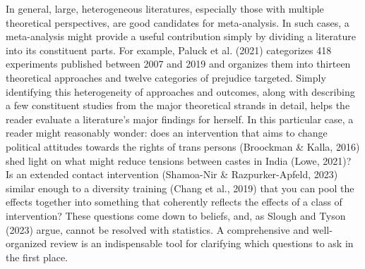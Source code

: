 \documentclass[
  man]{apa6}
\begin{document}
In general, large, heterogeneous literatures, especially those with multiple theoretical perspectives, are good candidates for meta-analysis. In such cases, a meta-analysis might provide a useful contribution simply by dividing a literature into its constituent parts. For example, Paluck et al. (2021) categorizes 418 experiments published between 2007 and 2019 and organizes them into thirteen theoretical approaches and twelve categories of prejudice targeted. Simply identifying this heterogeneity of approaches and outcomes, along with describing a few constituent studies from the major theoretical strands in detail, helps the reader evaluate a literature's major findings for herself. In this particular case, a reader might reasonably wonder: does an intervention that aims to change political attitudes towards the rights of trans persons (Broockman \& Kalla, 2016) shed light on what might reduce tensions between castes in India (Lowe, 2021)? Is an extended contact intervention (Shamoa-Nir \& Razpurker-Apfeld, 2023) similar enough to a diversity training (Chang et al., 2019) that you can pool the effects together into something that coherently reflects the effects of a class of intervention? These questions come down to beliefs, and, as Slough and Tyson (2023) argue, cannot be resolved with statistics. A comprehensive and well-organized review is an indispensable tool for clarifying which questions to ask in the first place.
\end{document}
